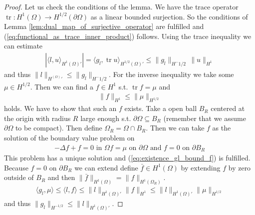 \documentclass[12pt,a4paper]{article}
\numberwithin{equation}{subsection}
\numberwithin{lemma}{subsection}
\theoremstyle{definition}
\DeclareMathOperator{\tr}{tr}
\begin{document}
\begin{proof}
    Let us check the conditions of the lemma. We have the trace operator 
    $\tr: H^1(\Omega) \rightarrow H^{1/2}(\partial \Omega)$ as a 
    linear bounded surjection. So the conditions of 
    Lemma \ref{lem:dual_map_of_surjective_operator} are fulfilled 
    and (\ref{eq:functional_as_trace_inner_product}) follows.
    Using the trace inequality  we can estimate 
    \begin{align*}
        |\langle l, u \rangle_{H^1(\Omega)'}| = \langle g_l, \tr u \rangle_{H^{1/2}(\Omega)'}
        \leq \lVert g_l \rVert _{H^-1/2} \, \lVert u \rVert _{H^1} 
    \end{align*}
    and thus $\lVert l \rVert _{H^(\Omega)'} \leq \lVert g_l \rVert _{H^-1/2}$. For the inverse inequality
    we take some $\mu \in H^{1/2}$. Then we can find a $f \in H^1$ s.t. $\tr f = \mu$ and 
    \begin{align}
        \lVert f \rVert _{H^1} \leq \lVert \mu \rVert _{H^{1/2}}\label{eq:existence_gl_bound_f}
    \end{align}
    holds.
    We have to show that such an $f$ exists. Take a open ball $B_R$ centered at the 
    origin with radius $R$ large enough s.t. $\partial \Omega \subseteq B_R$ (remember 
    that we assume $\partial \Omega$ to be compact). Then define 
    $\Omega_R = \Omega \cap B_R$.
    Then we can take $f$ as the solution of the boundary value problem on 
    \begin{align*}
        -\Delta f + f = 0 \text{ in $\Omega$}
        f = \mu \text{ on $\partial \Omega$ and $f = 0$ on $\partial B_R$}
    \end{align*}
    This problem has a unique solution \cite[Thm.3.12]{monk} and 
    (\ref{eq:existence_gl_bound_f}) is fulfilled. Because 
    $f= 0$ on $\partial B_R$ we can extend define $\bar{f} \in H^1(\Omega)$ by 
    extending $f$ by zero outside of $B_R$ and then 
    $\lVert \bar{f} \rVert _{H^1(\Omega)} =  \lVert f \rVert _{H^1(\Omega_R)}$.
    \begin{align*}
        \langle g_l, \mu \rangle \leq \langle l, f \rangle 
        \leq \lVert l \rVert _{H^1(\Omega)'} \lVert  f \rVert _{H^1}
        \leq \lVert l \rVert _{H^1(\Omega)'} \lVert  \mu \rVert _{H^{1/2}}
    \end{align*}
    and thus $\lVert g_l \rVert _{H^{-1/2}} \leq \lVert l \rVert _{H^1(\Omega)'}$.
\end{proof}
\end{document}
